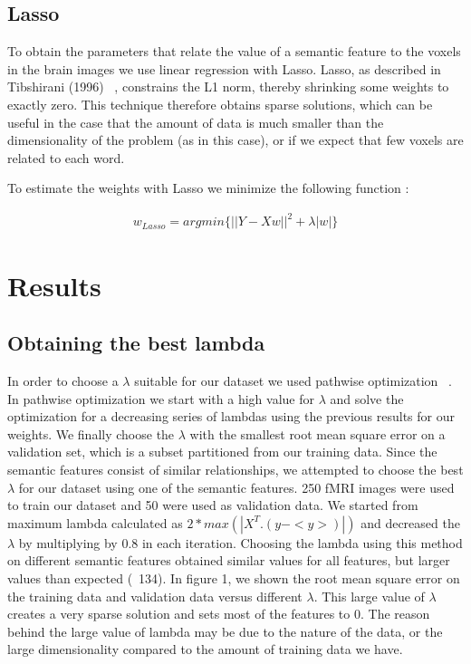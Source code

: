 \documentclass{article} %
\begin{document}
\subsection{Lasso}

To obtain the parameters that relate the value of a semantic feature to the voxels in the brain images we use linear regression with Lasso. Lasso, as described in Tibshirani (1996) ~\cite{lasso}, constrains the L1 norm, thereby shrinking some weights to exactly zero. This technique therefore obtains sparse solutions, which can be useful in the case that the amount of data is much smaller than the dimensionality of the problem (as in this case), or if we expect that few voxels are related to each word. 

To estimate the weights with Lasso we minimize the following function :

\begin{align*}
w_{Lasso} = argmin \{|| Y - Xw ||^2 + \lambda|w|\}
\end{align*}



\section{Results}


\subsection{Obtaining the best lambda}
In order to choose a $\lambda$ suitable for our dataset we used pathwise optimization ~\cite{friedman2010regularization}. In pathwise optimization we start with a high value for  $\lambda$ and solve the optimization for a decreasing series of lambdas using the previous results for our weights. We finally choose the $\lambda$ with the smallest root mean square error on a validation set, which is a subset partitioned from our training data. Since the semantic features consist of similar relationships, we attempted to choose the best $\lambda$ for our dataset using one of the semantic features. 250 fMRI images were used to train our dataset and 50 were used as validation data. We started from maximum lambda calculated as $2 * max (|X^T.(y - <y>)|)$ and decreased the $\lambda$ by multiplying by 0.8 in each iteration. Choosing the lambda using this method on different semantic features obtained similar values for all features, but larger values than expected (~134). In figure 1, we shown the root mean square error on the training data and validation data versus different $\lambda$. This large value of $\lambda$ creates a very sparse solution and sets most of the features to 0. The reason behind the large value of lambda may be due to the nature of the data, or the large dimensionality compared to the amount of training data we have.
\end{document}
